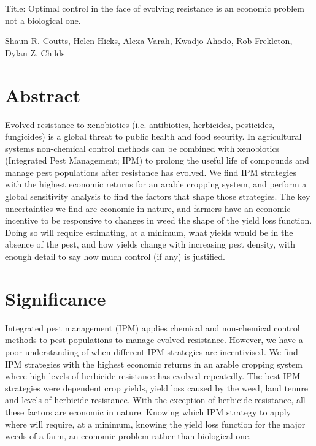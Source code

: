 \documentclass[12pt, a4paper]{article}
\begin{document}
Title: Optimal control in the face of evolving resistance is an economic problem not a biological one.

Shaun R. Coutts, Helen Hicks, Alexa Varah, Kwadjo Ahodo, Rob Frekleton, Dylan Z. Childs 

\newpage

\section*{Abstract}
Evolved resistance to xenobiotics (i.e. antibiotics, herbicides, pesticides, fungicides) is a global threat to public health and food security. In agricultural systems non-chemical control methods can be combined with xenobiotics (Integrated Pest Management; IPM) to prolong the useful life of compounds and manage pest populations after resistance has evolved. We find IPM strategies with the highest economic returns for an arable cropping system, and perform a global sensitivity analysis to find the factors that shape those strategies. The key uncertainties we find are economic in nature, and farmers have an economic incentive to be responsive to changes in weed the shape of the yield loss function. Doing so will require estimating, at a minimum, what yields would be in the absence of the pest, and how yields change with increasing pest density, with enough detail to say how much control (if any) is justified.            

\section*{Significance}
Integrated pest management (IPM) applies chemical and non-chemical control methods to pest populations to manage evolved resistance. However, we have a poor understanding of when different IPM strategies are incentivised. We find IPM strategies with the highest economic returns in an arable cropping system where high levels of herbicide resistance has evolved repeatedly. The best IPM strategies were dependent crop yields, yield loss caused by the weed, land tenure and levels of herbicide resistance. With the exception of herbicide resistance, all these factors are economic in nature. Knowing which IPM strategy to apply where will require, at a minimum, knowing the yield loss function for the major weeds of a farm, an economic problem rather than biological one.

\newpage
\end{document}
